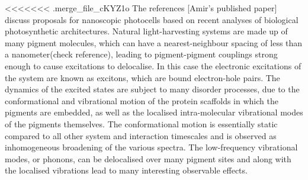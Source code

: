 \documentclass[]{article}
\begin{document}
<<<<<<< .merge_file_cKYZ1o
The references \cite{Creatore2013}\cite{Dorfman}[Amir's published paper] discuss proposals for nanoscopic photocells based on recent analyses of biological photosynthetic architectures. Natural light-harvesting systems are made up of many pigment molecules, which can have a nearest-neighbour spacing of less than a nanometer\cite{Adolphs2006}(check reference), leading to pigment-pigment couplings strong enough to cause excitations to delocalise. In this case the electronic excitations of the system are known as excitons, which are bound electron-hole pairs. The dynamics of the excited states are subject to many disorder processes, due to the conformational and vibrational motion of the protein scaffolds in which the pigments are embedded, as well as the localised intra-molecular vibrational modes of the pigments themselves\cite{}. The conformational motion is essentially static compared to all other system and interaction timescales and is observed as inhomogeneous broadening of the various spectra. The low-frequency vibrational modes, or phonons, can be delocalised over many pigment sites and along with the localised vibrations lead to many interesting observable effects.
\end{document}
